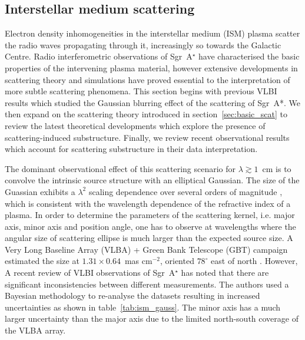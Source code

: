 \subsection{Interstellar medium scattering}\label{sec:ism_scat}

Electron density inhomogeneities in the interstellar medium (ISM) plasma scatter the radio waves propagating through it, increasingly so towards the Galactic Centre. Radio interferometric observations of Sgr~A$^\star$ have characterised the basic properties of the intervening plasma material, however extensive developments in scattering theory and simulations have proved essential to the interpretation of more subtle scattering phenomena. This section begins with previous VLBI results which studied the Gaussian blurring effect of the scattering of Sgr~A*. We then expand on the scattering theory introduced in section~\ref{sec:basic_scat} to review the latest theoretical developments which explore the presence of scattering-induced substructure. Finally, we review recent observational results which account for scattering substructure in their data interpretation. 


The dominant observational effect of this scattering scenario for $\lambda \gtrsim 1$~cm is to convolve the intrinsic source structure with an elliptical Gaussian. The size of the Guassian exhibits a $\lambda^2$ scaling dependence over several orders of magnitude \citep[Fig.~\ref{fig:scattering_law}][]{Backer_1978, Shen_2005, Bower_2006, Lu_2011}, which is consistent with the wavelength dependence of the refractive index of a plasma. In order to determine the parameters of the scattering kernel, i.e. major axis, minor axis and position angle,  one has to observe at wavelengths where the angular size of scattering ellipse is much larger than the expected source size. A Very Long Baseline Array (VLBA) + Green Bank Telescope (GBT) campaign  estimated the size at $1.31 \times 0.64$~mas cm$^{-2}$, oriented $78^\circ$ east of north \citep{Bower_2006}. However, A recent review of VLBI observations of Sgr~A$^\star$ \cite{Psaltis_2015} has noted that there are significant inconsistencies between different measurements. The authors used a Bayesian methodology to re-analyse the datasets resulting in increased uncertainties as shown in table~\ref{tab:ism_gauss}. The minor axis has a much larger uncertainty than the major axis due to the limited north-south coverage of the VLBA array. 



